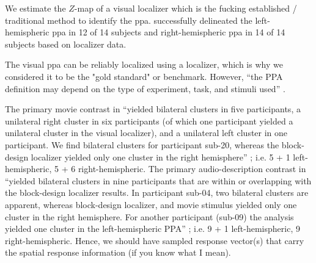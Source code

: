 We estimate the $Z$-map of a visual localizer which is the fucking established /
traditional method to identify the \ac{ppa}.
%
\citet{sengupta2016extension} successfully delineated the left-hemispheric
\ac{ppa} in 12 of 14 subjects and right-hemispheric \ac{ppa} in 14 of 14
subjects based on localizer data.

The visual \ac{ppa} can be reliably localized using a localizer, which is why we
considered it to be the "gold standard" or benchmark.
%
However, ``the PPA definition may depend on the type of experiment, task, and
stimuli used'' \citep{weiner2018defining}.

%
The primary movie contrast in \citet{haeusler2022processing} ``yielded bilateral
clusters in five participants, a unilateral right cluster in six participants
(of which one participant yielded a unilateral cluster in the visual localizer),
and a unilateral left cluster in one participant. We find bilateral clusters for
participant sub-20, whereas the block-design localizer yielded only one cluster
in the right hemisphere'' \citep{haeusler2022processing};
%
i.e. 5 + 1  left-hemispheric, 5 + 6 right-hemispheric.
%
%
The primary audio-description contrast in \citet{haeusler2022processing}
``yielded bilateral clusters in nine participants that are within or overlapping
with the block-design localizer results. In participant sub-04, two bilateral
clusters are apparent, whereas block-design localizer, and movie stimulus
yielded only one cluster in the right hemisphere.  For another participant
(sub-09) the analysis yielded one cluster in the left-hemispheric PPA''
\citep{haeusler2022processing};
i.e. 9 + 1 left-hemispheric, 9 right-hemispheric.
%
Hence, we should have sampled response vector(s) that carry the spatial response
information (if you know what I mean).

